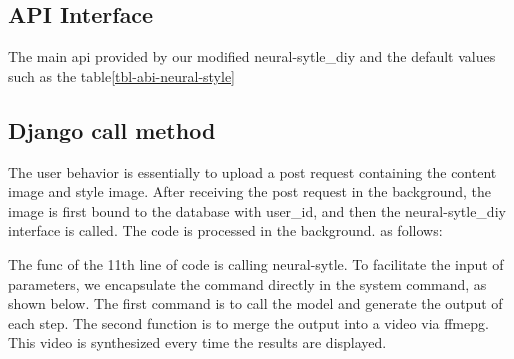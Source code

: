 \subsection{API Interface}
The main api provided by our modified neural-sytle\_diy and the default values such as the table\ref{tbl-abi-neural-style}
\subsection{Django call method}
The user behavior is essentially to upload a post request containing the content image and style image. After receiving the post request in the background, the image is first bound to the database with user\_id, and then the neural-sytle\_diy interface is called. The code is processed in the background. as follows:

The func of the 11th line of code is calling neural-sytle. To facilitate the input of parameters, we encapsulate the command directly in the system command, as shown below. The first command is to call the model and generate the output of each step. The second function is to merge the output into a video via ffmepg. This video is synthesized every time the results are displayed.
